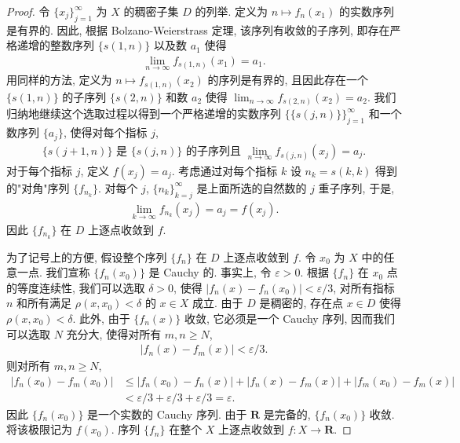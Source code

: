 \documentclass[../../main.tex]{subfiles}
\begin{document}
\begin{proof}
令 $\{x_{j}\}_{j=1}^{\infty}$ 为 $X$ 的稠密子集 $D$ 的列举. 定义为 $n\mapsto f_{n}(x_{1})$ 的实数序列是有界的. 因此, 根据 Bolzano-Weierstrass 定理, 该序列有收敛的子序列, 即存在严格递增的整数序列 $\{s(1,n)\}$ 以及数 $a_{1}$ 使得
\begin{align*}
\lim_{n\to\infty}f_{s(1,n)}(x_{1})=a_{1}.
\end{align*}
用同样的方法, 定义为 $n\mapsto f_{s(1,n)}(x_{2})$ 的序列是有界的, 且因此存在一个 $\{s(1,n)\}$ 的子序列 $\{s(2,n)\}$ 和数 $a_{2}$ 使得 $\lim_{n\to\infty}f_{s(2,n)}(x_{2})=a_{2}$. 我们归纳地继续这个选取过程以得到一个严格递增的实数序列 $\{\{s(j,n)\}\}_{j=1}^{\infty}$ 和一个数序列 $\{a_{j}\}$, 使得对每个指标 $j$,
\begin{align*}
\{s(j+1,n)\}\text{ 是 }\{s(j,n)\}\text{ 的子序列且 }\lim_{n\to\infty}f_{s(j,n)}(x_{j})=a_{j}.
\end{align*}
对于每个指标 $j$, 定义 $f(x_{j})=a_{j}$. 考虑通过对每个指标 $k$ 设 $n_{k}=s(k,k)$ 得到的"对角"序列 $\{f_{n_{k}}\}$. 对每个 $j$, $\{n_{k}\}_{k=j}^{\infty}$ 是上面所选的自然数的 $j$ 重子序列, 于是,
\begin{align*}
\lim_{k\to\infty}f_{n_{k}}(x_{j})=a_{j}=f(x_{j}).
\end{align*}
因此 $\{f_{n_{k}}\}$ 在 $D$ 上逐点收敛到 $f$.

为了记号上的方便, 假设整个序列 $\{f_{n}\}$ 在 $D$ 上逐点收敛到 $f$. 令 $x_{0}$ 为 $X$ 中的任意一点. 我们宣称 $\{f_{n}(x_{0})\}$ 是 Cauchy 的. 事实上, 令 $\varepsilon>0$. 根据 $\{f_{n}\}$ 在 $x_{0}$ 点的等度连续性, 我们可以选取 $\delta>0$, 使得 $|f_{n}(x)-f_{n}(x_{0})|<\varepsilon/3$, 对所有指标 $n$ 和所有满足 $\rho(x,x_{0})<\delta$ 的 $x\in X$ 成立. 由于 $D$ 是稠密的, 存在点 $x\in D$ 使得 $\rho(x,x_{0})<\delta$. 此外, 由于 $\{f_{n}(x)\}$ 收敛, 它必须是一个 Cauchy 序列, 因而我们可以选取 $N$ 充分大, 使得对所有 $m,n\geqslant N$,
\begin{align*}
|f_{n}(x)-f_{m}(x)|<\varepsilon/3.
\end{align*}
则对所有 $m,n\geqslant N$,
\begin{align*}
|f_{n}(x_{0})-f_{m}(x_{0})|&\leqslant|f_{n}(x_{0})-f_{n}(x)|+|f_{n}(x)-f_{m}(x)|+|f_{m}(x_{0})-f_{m}(x)|\\
&<\varepsilon/3+\varepsilon/3+\varepsilon/3=\varepsilon.
\end{align*}
因此 $\{f_{n}(x_{0})\}$ 是一个实数的 Cauchy 序列. 由于 $\mathbf{R}$ 是完备的, $\{f_{n}(x_{0})\}$ 收敛. 将该极限记为 $f(x_{0})$. 序列 $\{f_{n}\}$ 在整个 $X$ 上逐点收敛到 $f:X\to\mathbf{R}$.
\end{proof}
\end{document}
